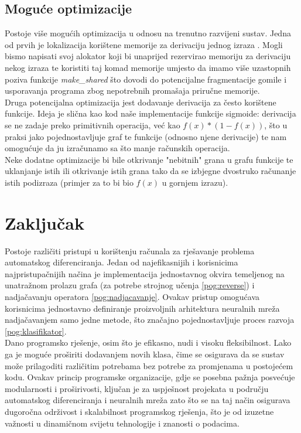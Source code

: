 \documentclass[zavrsnirad]{fer}
\begin{document}
\pagebreak
\section{Moguće optimizacije}
Postoje više mogućih optimizacija u odnosu na trenutno razvijeni sustav. Jedna od prvih je lokalizacija korištene memorije za derivaciju jednog izraza \cite{margossian2019review}. Mogli bismo napisati svoj alokator koji bi unaprijed rezervirao memoriju za derivaciju nekog izraza te koristiti taj komad memorije umjesto da imamo više uzastopnih poziva funkcije \textit{make\_shared} što dovodi do potencijalne fragmentacije gomile i usporavanja programa zbog nepotrebnih promašaja priručne memorije.
\\
Druga potencijalna optimizacija jest dodavanje derivacija za često korištene funkcije. Ideja je slična kao kod naše implementacije funkcije sigmoide: derivacija se ne zadaje preko primitivnih operacija, već kao $f(x) * (1 - f(x))$, što u praksi jako pojednostavljuje graf te funkcije (odnosno njene derivacije) te nam omogućuje da ju izračunamo sa što manje računskih operacija.
\\
Neke dodatne optimizacije bi bile otkrivanje "nebitnih" grana u grafu funkcije te uklanjanje istih ili otkrivanje istih grana tako da se izbjegne dvostruko računanje istih podizraza (primjer za to bi bio $f(x)$ u gornjem izrazu).

\chapter{Zaključak}
\label{pog:zakljucak}

Postoje različiti pristupi u korištenju računala za rješavanje problema automatskog diferenciranja. Jedan od najefikasnijih i korisnicima najpristupačnijih načina je implementacija jednostavnog okvira temeljenog na unatražnom prolazu grafa (za potrebe strojnog učenja \ref{pog:reverse}) i nadjačavanju operatora \ref{pog:nadjacavanje}. Ovakav pristup omogućava korisnicima jednostavno definiranje proizvoljnih arhitektura neuralnih mreža nadjačavanjem samo jedne metode, što značajno pojednostavljuje proces razvoja \ref{pog:klasifikator}.
\\
Dano programsko rješenje, osim što je efikasno, nudi i visoku fleksibilnost. Lako ga je moguće proširiti dodavanjem novih klasa, čime se osigurava da se sustav može prilagoditi različitim potrebama bez potrebe za promjenama u postojećem kodu. Ovakav princip programske organizacije, gdje se posebna pažnja posvećuje modularnosti i proširivosti, ključan je za uspješnost projekata u području automatskog diferenciranja i neuralnih mreža zato što se na taj način osigurava dugoročna održivost i skalabilnost programskog rješenja, što je od izuzetne važnosti u dinamičnom svijetu tehnologije i znanosti o podacima.
\\
\end{document}
